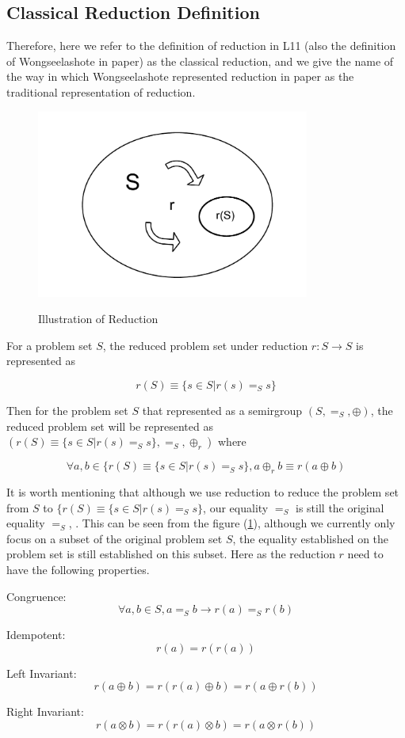 \documentclass[a4paper,10pt]{article}
\newcommand{\e}[2]{
\begin{equation}
  \label{#1} 
  #2
\end{equation}
}
\begin{document}
\subsection{Classical Reduction Definition}
Therefore, here we refer to the definition of reduction in L11 (also the definition of Wongseelashote in paper) as the classical reduction, and we give the name of the way in which Wongseelashote represented reduction in paper as the traditional representation of reduction.
\begin{figure}[H]
\centering
\includegraphics[width=0.8\textwidth]{reduction.pdf}
\label{reduction}
\caption{Illustration of Reduction}
\end{figure}
For a problem set $S$, the reduced problem set under reduction $r: S \rightarrow S$ is represented as 
\e{r:def:traditional}{r(S) \equiv \{s \in S | r(s) =_S s\}}
Then for the problem set $S$ that represented as a semirgroup $(S,=_S,\oplus)$, the reduced problem set will be represented as $({r(S) \equiv \{s \in S | r(s) =_S s\}},=_S,\oplus_r)$ where 
\e{r:def:binary_operator}{\forall a, b \in \{r(S) \equiv \{s \in S | r(s) =_S s\}, a \oplus_r b \equiv r(a \oplus b)}
It is worth mentioning that although we use reduction to reduce the problem set from $S$ to $\{r(S) \equiv \{s \in S | r(s) =_S s\}$, our equality $=_S$ is still the original equality $=_S$, .
This can be seen from the figure (\ref{reduction}), although we currently only focus on a subset of the original problem set $S$, the equality established on the problem set is still established on this subset.
Here as the reduction $r$ need to have the following properties.

Congruence: \e{r:def:congruence}{\forall a,b \in S, a =_S b \rightarrow r(a) =_S r(b)}
Idempotent: \e{r:def:idempotent}{r(a) = r(r(a))} 
Left Invariant: \e{r:def:left_invariant}{r(a\oplus b) = r(r(a)\oplus b) = r(a\oplus r(b))}
Right Invariant: \e{r:def:right_invariant}{r(a\otimes b) = r(r(a)\otimes b) = r(a\otimes r(b))}
\end{document}
